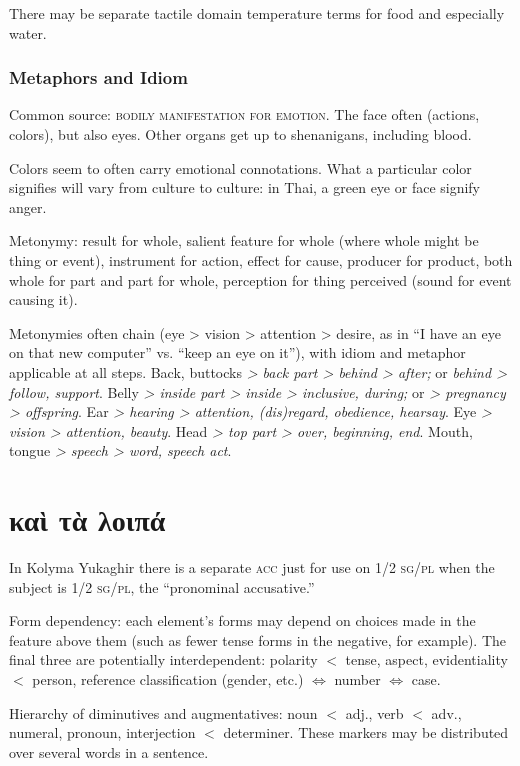 \documentclass[11pt]{article}
\newcommand{\I}[1]{\textsc{#1}}   %
\begin{document}
There may be separate tactile domain temperature terms for food and
especially water.

\subsubsection{Metaphors and Idiom}
Common source: \I{bodily manifestation for emotion}. The face often
(actions, colors), but also eyes. Other organs get up to shenanigans,
including blood.

Colors seem to often carry emotional connotations.  What a
particular color signifies will vary from culture to culture: in Thai,
a green eye or face signify anger.

Metonymy: result for whole, salient feature for whole (where whole
might be thing or event), instrument for action, effect for cause,
producer for product, both whole for part and part for whole,
perception for thing perceived (sound for event causing it).

Metonymies often chain (eye > vision > attention > desire, as in ``I
have an eye on that new computer'' vs. ``keep an eye on it''), with
idiom and metaphor applicable at all steps.  Back, buttocks \textit{>
back part > behind > after;} or \textit{behind > follow, support}.
Belly \textit{> inside part > inside > inclusive, during;} or
\textit{> pregnancy > offspring}.  Ear \textit{> hearing > attention,
(dis)regard, obedience, hearsay}.  Eye \textit{> vision > attention,
beauty}.  Head \textit{> top part > over, beginning, end}.  Mouth,
tongue \textit{> speech > word, speech act}.




\section{καὶ τὰ λοιπά}
In Kolyma Yukaghir there is a separate \I{acc} just for use on \I{1/2
sg/pl} when the subject is \I{1/2 sg/pl}, the ``pronominal
accusative.'' 

Form dependency: each element's forms may depend on choices made in
the feature above them (such as fewer tense forms in the negative, for
example).  The final three are potentially interdependent: polarity
$<$ tense, aspect, evidentiality $<$ person, reference classification
(gender, etc.) $\Leftrightarrow$ number $\Leftrightarrow$ case.

Hierarchy of diminutives and augmentatives: noun $<$ adj., verb $<$
adv., numeral, pronoun, interjection $<$ determiner.  These markers
may be distributed over several words in a sentence.
\end{document}
